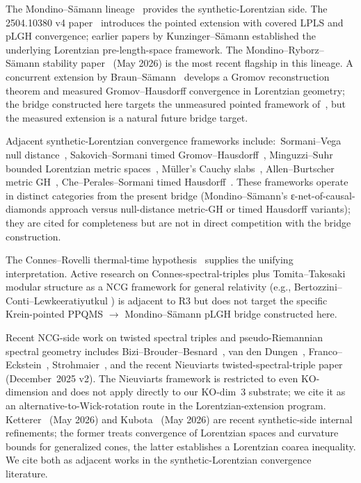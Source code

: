 \documentclass[11pt,a4paper]{article}
\theoremstyle{plain}
\theoremstyle{definition}
\begin{document}
The Mondino--S\"amann lineage~\cite{mondino_samann2025_pointed,
kunzinger_samann2018, mondino_ryborz_samann2025} provides the
synthetic-Lorentzian side. The 2504.10380 v4 paper~\cite{mondino_samann2025_pointed}
introduces the pointed extension with covered LPLS and pLGH
convergence; earlier papers by Kunzinger--S\"amann established the
underlying Lorentzian pre-length-space framework. The
Mondino--Ryborz--S\"amann stability paper~\cite{mondino_ryborz_samann2025}
(May 2026) is the most recent flagship in this lineage.
A concurrent extension by Braun--S\"amann~\cite{braun_samann2025}
develops a Gromov reconstruction theorem and measured Gromov--Hausdorff
convergence in Lorentzian geometry; the bridge constructed here targets
the unmeasured pointed framework of~\cite{mondino_samann2025_pointed},
but the measured extension is a natural future bridge target.

Adjacent synthetic-Lorentzian convergence frameworks include:\
Sormani--Vega null distance~\cite{sormani_vega2016},
Sakovich--Sormani timed Gromov--Hausdorff~\cite{sakovich_sormani2024},
Minguzzi--Suhr bounded Lorentzian metric
spaces~\cite{minguzzi_suhr2024}, M\"uller's Cauchy
slabs~\cite{muller2022}, Allen--Burtscher metric
GH~\cite{allen_burtscher2022}, Che--Perales--Sormani timed
Hausdorff~\cite{che_perales_sormani2025}. These frameworks operate in
distinct categories from the present bridge (Mondino--S\"amann's
ε-net-of-causal-diamonds approach versus null-distance metric-GH or
timed Hausdorff variants); they are cited for completeness but are not
in direct competition with the bridge construction.

The Connes--Rovelli thermal-time hypothesis~\cite{connes_rovelli1994}
supplies the unifying interpretation. Active research on
Connes-spectral-triples plus Tomita--Takesaki modular structure as a
NCG framework for general relativity (e.g., Bertozzini--Conti--Lewkeeratiyutkul
\cite{bertozzini_conti_lewkeeratiyutkul2009}) is adjacent to R3 but
does not target the specific Krein-pointed PPQMS $\to$
Mondino--S\"amann pLGH bridge constructed here.

Recent NCG-side work on twisted spectral triples and pseudo-Riemannian
spectral geometry includes Bizi--Brouder--Besnard~\cite{bizi_brouder_besnard2018},
van den Dungen~\cite{vandungen2016}, Franco--Eckstein~\cite{franco_eckstein2014},
Strohmaier~\cite{strohmaier2006}, and the recent Nieuviarts
twisted-spectral-triple paper~\cite{nieuviarts2025_v2} (December~2025
v2). The Nieuviarts framework is restricted to even KO-dimension and
does not apply directly to our KO-dim~3 substrate; we cite it as an
alternative-to-Wick-rotation route in the Lorentzian-extension
program. Ketterer~\cite{ketterer2026} (May 2026) and
Kubota~\cite{kubota2026} (May 2026) are recent synthetic-side
internal refinements; the former treats convergence of Lorentzian
spaces and curvature bounds for generalized cones, the latter
establishes a Lorentzian coarea inequality. We cite both as adjacent works in the synthetic-Lorentzian
convergence literature.
\end{document}
